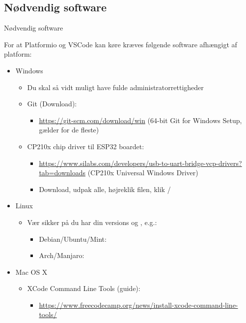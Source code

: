 \documentclass[aspectratio=169]{beamer}
\begin{document}
\subsection{Nødvendig software}
\begin{frame}{Nødvendig software}
	\begin{textBox}
	For at Platformio og VSCode kan køre kræves følgende software afhængigt af platform:
		\begin{itemize}
			\item Windows
			\begin{itemize}
				\item Du skal så vidt muligt have fulde administratorrettigheder
				\item Git (Download):
				\begin{itemize}
					\item \small\url{https://git-scm.com/download/win} (64-bit Git for Windows Setup, gælder for de fleste)
				\end{itemize}
				\item CP210x chip driver til ESP32 boardet:
				\begin{itemize}
					\item \small\url{https://www.silabs.com/developers/usb-to-uart-bridge-vcp-drivers?tab=downloads} (CP210x Universal Windows Driver)
					\item Download, udpak alle, højreklik  filen, klik /
				\end{itemize}
			\end{itemize}
			\item Linux
			\begin{itemize}
				\item Vær sikker på du har din versions  og , e.g.:
				\begin{itemize}
					\item Debian/Ubuntu/Mint: \small{}
					\item Arch/Manjaro: \small{}
				\end{itemize}
			\end{itemize}
			\item Mac OS X
			\begin{itemize}
				\item XCode Command Line Tools (guide):
				\begin{itemize}
					\item \small\url{https://www.freecodecamp.org/news/install-xcode-command-line-tools/}
				\end{itemize}
			\end{itemize}
		\end{itemize}
	\end{textBox}
\end{frame}
\end{document}
